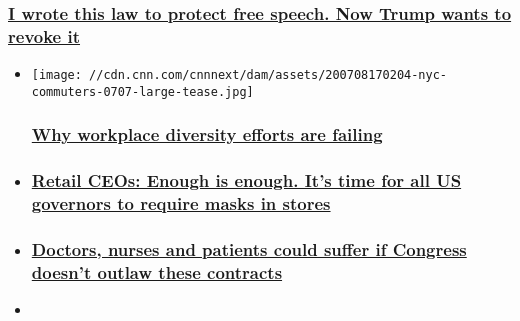\begin{itemize}
{  \subsubsection{\texorpdfstring{\href{/2020/06/09/perspectives/ron-wyden-section-230/index.html}{I
  wrote this law to protect free speech. Now Trump wants to revoke
  it}}{I wrote this law to protect free speech. Now Trump wants to revoke it}}\label{i-wrote-this-law-to-protect-free-speech-now-trump-wants-to-revoke-it}}
\end{itemize}

\begin{itemize}
\item
  \href{/2020/07/09/perspectives/diversity-failures-workplace/index.html}{}

  \texttt{[image: //cdn.cnn.com/cnnnext/dam/assets/200708170204-nyc-commuters-0707-large-tease.jpg]}

  \hypertarget{why-workplace-diversity-efforts-are-failing-}{%
  \subsubsection{\texorpdfstring{\href{/2020/07/09/perspectives/diversity-failures-workplace/index.html}{Why
  workplace diversity efforts are failing
  }}{Why workplace diversity efforts are failing }}\label{why-workplace-diversity-efforts-are-failing-}}
\item
  \hypertarget{retail-ceos-enough-is-enough-its-time-for-all-us-governors-to-require-masks-in-stores}{%
  \subsubsection{\texorpdfstring{\href{/2020/07/17/perspectives/masks-shopping-retail-ceos/index.html}{Retail
  CEOs: Enough is enough. It's time for all US governors to require
  masks in
  stores}}{Retail CEOs: Enough is enough. It's time for all US governors to require masks in stores}}\label{retail-ceos-enough-is-enough-its-time-for-all-us-governors-to-require-masks-in-stores}}
\item
  \hypertarget{doctors-nurses-and-patients-could-suffer-if-congress-doesnt-outlaw-these-contracts}{%
  \subsubsection{\texorpdfstring{\href{/2020/07/06/perspectives/non-compete-clauses-health-care/index.html}{Doctors,
  nurses and patients could suffer if Congress doesn't outlaw these
  contracts}}{Doctors, nurses and patients could suffer if Congress doesn't outlaw these contracts}}\label{doctors-nurses-and-patients-could-suffer-if-congress-doesnt-outlaw-these-contracts}}
\item
  \hypertarget{to-fight-racism-in-the-workplace-we-need-to-stop-treating-certain-topics-as-taboo}{%
}
\end{itemize}
